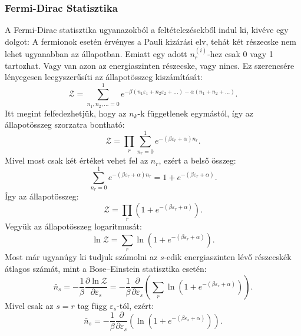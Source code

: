 \documentclass[../main.tex]{subfiles}
\begin{document}
\subsubsection{Fermi-Dirac Statisztika}
A Fermi-Dirac statisztika ugyanazokból a feltételezésekből indul ki, kivéve egy dolgot: A fermionok esetén érvényes a Pauli kizárási elv, tehát két részecske nem lehet ugyanabban az állapotban.
Emiatt egy adott $n^{(i)}_r$-hez csak 0 vagy 1 tartozhat. Vagy van azon az energiaszinten részecske, vagy nincs. Ez szerencsére lényegesen leegyszerűsíti az állapotösszeg kiszámítását:
\begin{equation}
    \mathcal{Z} = \sum_{n_1, n_2, \ldots = 0}^{1} e^{-\beta (n_1 \varepsilon_1 + n_2 \varepsilon_2 + \ldots) - \alpha(n_1 + n_2 + \ldots)}.
\end{equation}
Itt megint felfedezhetjük, hogy az $n_k$-k függetlenek egymástól, így az állapotösszeg szorzatra bontható:
\begin{equation}
    \mathcal{Z} = \prod_r \sum_{n_r = 0}^{1} e^{-(\beta \varepsilon_r + \alpha)n_r}.
\end{equation}
Mivel most csak két értéket vehet fel az $n_r$, ezért a belső összeg:
\begin{equation}
    \sum_{n_r = 0}^{1} e^{-(\beta \varepsilon_r + \alpha)n_r} = 1 + e^{-(\beta \varepsilon_r + \alpha)}.
\end{equation}
Így az állapotösszeg:
\begin{equation}
    \mathcal{Z} = \prod_r (1 + e^{-(\beta \varepsilon_r + \alpha)}).
\end{equation}
Vegyük az állapotösszeg logaritmusát:
\begin{equation}
    \ln \mathcal{Z} = \sum_r \ln (1 + e^{-(\beta \varepsilon_r + \alpha)}).
\end{equation}
Most már ugyanúgy ki tudjuk számolni az $s$-edik energiaszinten lévő részecskék átlagos számát, mint a Bose–Einstein statisztika esetén:
\begin{equation}
    \bar{n}_s = - \frac{1}{\beta} \frac{\partial \ln \mathcal{Z}}{\partial \varepsilon_s} = - \frac{1}{\beta} \frac{\partial}{\partial \varepsilon_s} \left( \sum_r \ln (1 + e^{-(\beta \varepsilon_r + \alpha)}) \right).
\end{equation}
Mivel csak az $s=r$ tag függ $\varepsilon_s$-tól, ezért:
\begin{equation}
    \bar{n}_s = - \frac{1}{\beta} \frac{\partial}{\partial \varepsilon_s} \left( \ln (1 + e^{-(\beta \varepsilon_s + \alpha)}) \right).
\end{equation}
\end{document}
